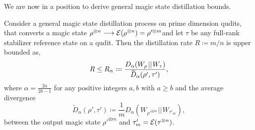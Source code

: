 \documentclass[pra,
aps,
twocolumn,
superscriptaddress,
groupedaddress,
nofootinbib,
reprint
]{revtex4-1}
\begin{document}
We are now in a position to derive general magic state distillation bounds.

\begingroup
\def\thetheorem{\ref{thm:entropic_bounds}}
\begin{theorem}
	Consider a general magic state distillation process on prime dimension qudits, that converts a magic state $\rho^{\otimes n} \longrightarrow {\mathcal E}(\rho^{\otimes n})=\rho'^{\otimes m}$and let $\tau$ be any full-rank stabilizer reference state on a qudit. Then the distillation rate $R \coloneqq m/n$ is upper bounded as,
	\begin{equation}
		R \leq R_\alpha \coloneqq \frac{D_{\alpha}(W_\rho \hspace{1pt}||\hspace{1pt} W_\tau)}{\rlap{\raisebox{-0.2ex}{$\widetilde{\phantom{D}}$}}D_\alpha( \rho', \tau')},
	\end{equation}
	where $\alpha = \frac{2a}{2b-1}$ for any positive integers $a,b$ with $a \geq b$ and the average divergence
	\begin{equation}
\widetilde{D}_\alpha( \rho', \tau') \coloneqq \frac{1}{m} D_\alpha (W_{\rho'^{\otimes m}} \hspace{1pt}||\hspace{1pt} W_{\tau'_m}),
\end{equation}
between the output magic state $\rho'^{\otimes m}$ and $\tau'_m = {\mathcal E}(\tau^{\otimes n})$.
\end{theorem}
\addtocounter{theorem}{-1}
\endgroup
\end{document}
